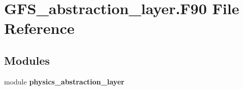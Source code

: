 \section{G\+F\+S\+\_\+abstraction\+\_\+layer.\+F90 File Reference}
\label{_g_f_s__abstraction__layer_8_f90}
\subsection*{Modules}
\begin{DoxyCompactItemize}
\item 
module \textbf{ physics\+\_\+abstraction\+\_\+layer}
\end{DoxyCompactItemize}
